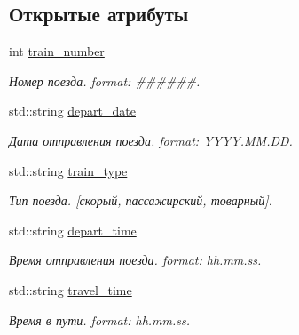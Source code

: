 \subsection*{Открытые атрибуты}
\begin{DoxyCompactItemize}
\item 
\mbox{\label{structObject_ae54e50ae2bd423c3c153c3499e3b6419}} 
int \mbox{\hyperlink{structObject_ae54e50ae2bd423c3c153c3499e3b6419}{train\+\_\+number}}
\begin{DoxyCompactList}\small\item\em Номер поезда. format\+: \#\#\#\#\#\#. \end{DoxyCompactList}\item 
\mbox{\label{structObject_a7d3a48437511af10875c026b9542d035}} 
std\+::string \mbox{\hyperlink{structObject_a7d3a48437511af10875c026b9542d035}{depart\+\_\+date}}
\begin{DoxyCompactList}\small\item\em Дата отправления поезда. format\+: Y\+Y\+Y\+Y.\+M\+M.\+DD. \end{DoxyCompactList}\item 
\mbox{\label{structObject_ac1e3f853318a046c185948abe518fa71}} 
std\+::string \mbox{\hyperlink{structObject_ac1e3f853318a046c185948abe518fa71}{train\+\_\+type}}
\begin{DoxyCompactList}\small\item\em Тип поезда. \mbox{[}скорый, пассажирский, товарный\mbox{]}. \end{DoxyCompactList}\item 
\mbox{\label{structObject_adde87e1918bc544551db4d1e299e255c}} 
std\+::string \mbox{\hyperlink{structObject_adde87e1918bc544551db4d1e299e255c}{depart\+\_\+time}}
\begin{DoxyCompactList}\small\item\em Время отправления поезда. format\+: hh.\+mm.\+ss. \end{DoxyCompactList}\item 
\mbox{\label{structObject_ae4e81087aa00048dcbeebcd952b55498}} 
std\+::string \mbox{\hyperlink{structObject_ae4e81087aa00048dcbeebcd952b55498}{travel\+\_\+time}}
\begin{DoxyCompactList}\small\item\em Время в пути. format\+: hh.\+mm.\+ss. \end{DoxyCompactList}\end{DoxyCompactItemize}


